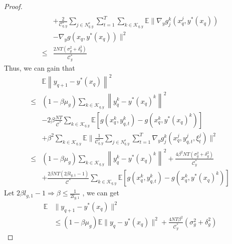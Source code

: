 \documentclass[lettersize,journal]{IEEEtran}
\begin{document}
\begin{proof}
\begin{align}
    \nonumber
    \\
    &+\frac{2}{\mathcal{C}^{s}_{q,y}}\sum_{j\in N^{s}_{q,y}}\sum_{t=1}^T\sum_{k\in \mathcal{K}_{q,y}}\mathbb{E}\|\nabla_y g^k_j(x_{q}^j,y^*(x_{q}))\nonumber\\&-\nabla_y g\left(x_{q},y^*(x_{q})\right)\|^2\nonumber\\
    \leq& \frac{2NT(\sigma_{g}^2+\delta_{g}^2)}{\mathcal{C}^{*}_{y}}
    \nonumber
\end{align}
Thus, we can gain that
\begin{align}
    &\mathbb{E} \left\|y_{q+1}-y^*(x_q)\right\|^2
    \nonumber
    \\
    \leq& (1-\beta\mu_g)\sum_{k\in \mathcal{K}_{q,y}}\left\|y_{q}^k-y^*(x_q)^k\right\|^2\nonumber\\&-2\beta\frac{NT}{\mathcal{C}^*} \sum_{k\in \mathcal{K}_{q,y}}\mathbb{E}\left[g(x_q^k,y_{q,t}^k)-g(x_q^k,y^*(x_q)^k)\right]\nonumber\\&+\beta^2\sum_{k\in \mathcal{K}_{q,y}}\mathbb{E}\|\frac{1}{\mathcal{C}^{s}_{q,y}}\sum_{j\in N^{s}_{q,y}}\sum_{t=1}^T \nabla_y g^k_j(x_{q}^j,y_{q,t}^j,\xi_t^j)\|^2
    \nonumber
    \\
    \leq& (1-\beta\mu_g)\sum_{k\in \mathcal{K}_{q,y}}\left\|y_{q}^k-y^*(x_q)^k\right\|^2+\frac{4\beta^2NT(\sigma_{g}^2+\delta_{g}^2)}{\mathcal{C}^{*}_{y}}\nonumber\\&+\frac{2\beta NT(2\beta l_{g,1}-1)}{\mathcal{C}^*} \sum_{k\in \mathcal{K}_{q,y}}\mathbb{E}\left[g(x_q^k,y_{q,t}^k)-g(x_q^k,y^*(x_q)^k)\right]\nonumber
    \nonumber
\end{align}
Let $2\beta l_{g,1}-1\Rightarrow \beta\leq\frac{1}{2l_{g,1}}$ , we can get
\begin{align*}
     \mathbb{E}&\|y_{q+1}-y^*(x_q)\|^2\\ &\leq(1-\beta\mu_g)\mathbb{E}\|y_{q}-y^*(x_q)\|^2+\frac{4NT\beta^2}{\mathcal{C}_y^*}(\sigma_{g}^2+\delta_{g}^2)
\end{align*}
\end{proof}
\end{document}
